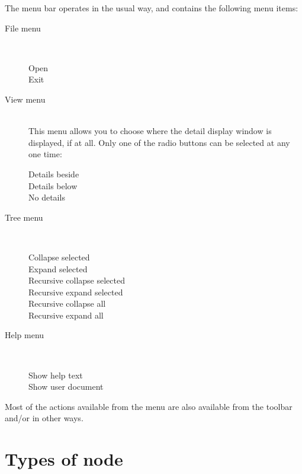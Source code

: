 \documentclass[twoside,11pt]{article}
\renewcommand{\_}{\texttt{\symbol{95}}}
\begin{document}
The menu bar operates in the usual way, and contains the following menu
items:
\begin{description}
\item[File menu]\mbox{}\\
   \begin{description}
   \item[Open] \actionOpen
   \item[Exit] \actionExit
   \end{description}
\item[View menu]\mbox{}\\
   This menu allows you to choose where the detail display window is displayed,
   if at all.  Only one of the radio buttons can be selected at any one
   time:
   \begin{description}
   \item[Details beside] \actionBeside
   \item[Details below] \actionBelow
   \item[No details] \actionNone
   \end{description}
\item[Tree menu]\mbox{}\\
   \begin{description}
   \item[Collapse selected] \actionCollapse
   \item[Expand selected] \actionExpand
   \item[Recursive collapse selected] \actionRCollapse
   \item[Recursive expand selected] \actionRExpand
   \item[Recursive collapse all] \actionRCollapseAll
   \item[Recursive expand all] \actionRExpandAll
   \end{description}
\item[Help menu]\mbox{}\\
   \begin{description}
   \item[Show help text] \actionHelp
   \item[Show user document] \actionSun
   \end{description}
\end{description}
      
Most of the actions available from the menu are also available from
the toolbar and/or in other ways.

\section{\label{sec:nodetypes}Types of node}
\end{document}
